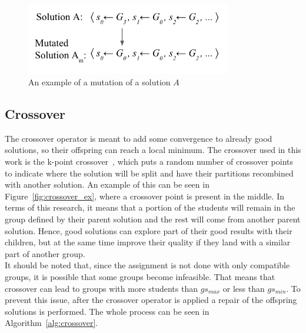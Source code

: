 \begin{figure}
    \centering
    \includegraphics[width=0.8\textwidth]{images/mutation_g.png}
    \caption{An example of a mutation of a solution $A$}
    \label{fig:mutation_ex}
\end{figure}

\subsection{Crossover}

The crossover operator is meant to add some convergence to already good solutions, so their offspring can reach a local minimum. The crossover used in this work is the k-point crossover~\cite{nomura1997analysis}, which puts a random number of crossover points to indicate where the solution will be split and have their partitions recombined with another solution. An example of this can be seen in Figure~\ref{fig:crossover_ex}, where a crossover point is present in the middle. In terms of this research, it means that a portion of the students will remain in the group defined by their parent solution and the rest will come from another parent solution. Hence, good solutions can explore part of their good results with their children, but at the same time improve their quality if they land with a similar part of another group.\\

It should be noted that, since the assignment is not done with only compatible groups, it is possible that some groups become infeasible. That means that crossover can lead to groups with more students than $gs_{max}$ or less than $gs_{min}$. To prevent this issue, after the crossover operator is applied a repair of the offspring solutions is performed. The whole process can be seen in Algorithm~\ref{alg:crossover}.\\

